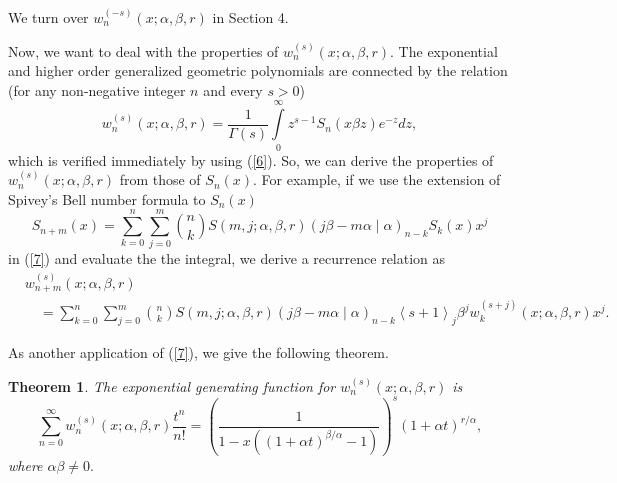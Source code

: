\documentclass{article}%
\newtheorem{theorem}{Theorem}
\begin{document}
We turn over $w_{n}^{\left(  -s\right)  }\left(  x;\alpha,\beta,r\right)  $ in
Section 4.

Now, we want to deal with the properties of $w_{n}^{\left(  s\right)  }\left(
x;\alpha,\beta,r\right)  .$ The exponential and higher order generalized
geometric polynomials are connected by the relation (for any non-negative
integer $n$ and every $s>0$)%
\begin{equation}
w_{n}^{\left(  s\right)  }\left(  x;\alpha,\beta,r\right)  =\frac{1}%
{\Gamma\left(  s\right)  }%
{\displaystyle\int\limits_{0}^{\infty}}
z^{s-1}S_{n}\left(  x\beta z\right)  e^{-z}dz, \label{7}%
\end{equation}
which is verified immediately by using (\ref{6}). So, we can derive the
properties of $w_{n}^{\left(  s\right)  }\left(  x;\alpha,\beta,r\right)  $
from those of $S_{n}\left(  x\right)  $. For example, if we use the extension
of Spivey's Bell number formula to $S_{n}\left(  x\right)  $ \cite{Kargin,
Aimin}%
\[
S_{n+m}\left(  x\right)  =\sum_{k=0}^{n}\sum_{j=0}^{m}\binom{n}{k}S\left(
m,j;\alpha,\beta,r\right)  \left(  j\beta-m\alpha\mid\alpha\right)
_{n-k}S_{k}\left(  x\right)  x^{j}%
\]
in (\ref{7}) and evaluate the the integral, we derive a recurrence relation
as
\begin{align*}
&  w_{n+m}^{\left(  s\right)  }\left(  x;\alpha,\beta,r\right) \\
&  \quad=\sum_{k=0}^{n}\sum_{j=0}^{m}\binom{n}{k}S\left(  m,j;\alpha
,\beta,r\right)  \left(  j\beta-m\alpha\mid\alpha\right)  _{n-k}\left\langle
s+1\right\rangle _{j}\beta^{j}w_{k}^{\left(  s+j\right)  }\left(
x;\alpha,\beta,r\right)  x^{j}.
\end{align*}


As another application of (\ref{7}), we give the following theorem.

\begin{theorem}
The exponential generating function for $w_{n}^{\left(  s\right)  }\left(
x;\alpha,\beta,r\right)  $ is
\begin{equation}
\sum_{n=0}^{\infty}w_{n}^{\left(  s\right)  }\left(  x;\alpha,\beta,r\right)
\frac{t^{n}}{n!}=\left(  \frac{1}{1-x\left(  \left(  1+\alpha t\right)
^{\beta/\alpha}-1\right)  }\right)  ^{s}\left(  1+\alpha t\right)  ^{r/\alpha
}, \label{8}%
\end{equation}
where $\alpha\beta\neq0.$
\end{theorem}
\end{document}

